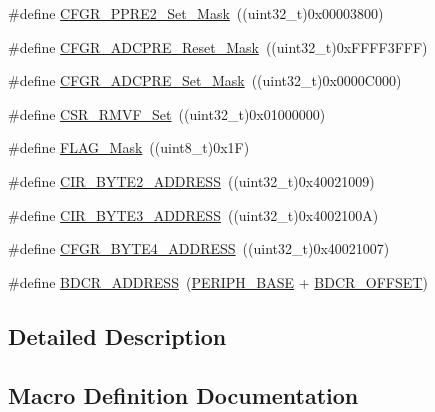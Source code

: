 \begin{DoxyCompactItemize}
\item 
\#define \mbox{\hyperlink{group___r_c_c___private___defines_ga63883951c986cf6dc1d6a8775f821af7}{C\+F\+G\+R\+\_\+\+P\+P\+R\+E2\+\_\+\+Set\+\_\+\+Mask}}~((uint32\+\_\+t)0x00003800)
\item 
\#define \mbox{\hyperlink{group___r_c_c___private___defines_ga12eb3f1b37b9101bf3810374bad68703}{C\+F\+G\+R\+\_\+\+A\+D\+C\+P\+R\+E\+\_\+\+Reset\+\_\+\+Mask}}~((uint32\+\_\+t)0x\+F\+F\+F\+F3\+F\+F\+F)
\item 
\#define \mbox{\hyperlink{group___r_c_c___private___defines_gaead9b35ba6e98274613c28d24bd228cc}{C\+F\+G\+R\+\_\+\+A\+D\+C\+P\+R\+E\+\_\+\+Set\+\_\+\+Mask}}~((uint32\+\_\+t)0x0000\+C000)
\item 
\#define \mbox{\hyperlink{group___r_c_c___private___defines_ga415e9d29487f0ef4101a9c6e4f20151f}{C\+S\+R\+\_\+\+R\+M\+V\+F\+\_\+\+Set}}~((uint32\+\_\+t)0x01000000)
\item 
\#define \mbox{\hyperlink{group___r_c_c___private___defines_ga2be62bf481cd44de9ab604efe5595ff6}{F\+L\+A\+G\+\_\+\+Mask}}~((uint8\+\_\+t)0x1\+F)
\item 
\#define \mbox{\hyperlink{group___r_c_c___private___defines_gaab58c3f3f81bf1ab9a14cf3fececd8c4}{C\+I\+R\+\_\+\+B\+Y\+T\+E2\+\_\+\+A\+D\+D\+R\+E\+SS}}~((uint32\+\_\+t)0x40021009)
\item 
\#define \mbox{\hyperlink{group___r_c_c___private___defines_ga43f47430582c9575970901533e525bb5}{C\+I\+R\+\_\+\+B\+Y\+T\+E3\+\_\+\+A\+D\+D\+R\+E\+SS}}~((uint32\+\_\+t)0x4002100\+A)
\item 
\#define \mbox{\hyperlink{group___r_c_c___private___defines_ga5fea86b59ec4be059d922db57cca3b3f}{C\+F\+G\+R\+\_\+\+B\+Y\+T\+E4\+\_\+\+A\+D\+D\+R\+E\+SS}}~((uint32\+\_\+t)0x40021007)
\item 
\#define \mbox{\hyperlink{group___r_c_c___private___defines_ga40b5a415d697b6af7babd8a208c92435}{B\+D\+C\+R\+\_\+\+A\+D\+D\+R\+E\+SS}}~(\mbox{\hyperlink{group___peripheral__memory__map_ga9171f49478fa86d932f89e78e73b88b0}{P\+E\+R\+I\+P\+H\+\_\+\+B\+A\+SE}} + \mbox{\hyperlink{group___r_c_c___private___defines_ga5f8a0c3cb5f5c835bf7eef09515138ad}{B\+D\+C\+R\+\_\+\+O\+F\+F\+S\+ET}})
\end{DoxyCompactItemize}


\subsection{Detailed Description}


\subsection{Macro Definition Documentation}
\mbox{\label{group___r_c_c___private___defines_ga40b5a415d697b6af7babd8a208c92435}} 
